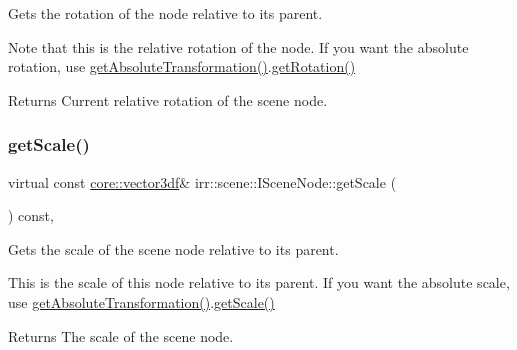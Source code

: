 Gets the rotation of the node relative to its parent. 

Note that this is the relative rotation of the node. If you want the absolute rotation, use \hyperlink{classirr_1_1scene_1_1ISceneNode_af13dc546a7be796cc0868a2eec51e508}{get\+Absolute\+Transformation()}.\hyperlink{classirr_1_1scene_1_1ISceneNode_acfef9f174e2398b479915791e4084061}{get\+Rotation()} \begin{DoxyReturn}{Returns}
Current relative rotation of the scene node. 
\end{DoxyReturn}
\mbox{\label{classirr_1_1scene_1_1ISceneNode_a97a5963f8b7b3cdf6fa196863c641c1d}} 
\subsubsection{\texorpdfstring{get\+Scale()}{getScale()}\hspace{0.1cm}{\footnotesize\ttfamily [1/2]}}
{\footnotesize\ttfamily virtual const \hyperlink{namespaceirr_1_1core_ae6e2b2a6c552833ebbd5b7463d03586b}{core\+::vector3df}\& irr\+::scene\+::\+I\+Scene\+Node\+::get\+Scale (\begin{DoxyParamCaption}{ }\end{DoxyParamCaption}) const\hspace{0.3cm}{\ttfamily [inline]}, {\ttfamily [virtual]}}



Gets the scale of the scene node relative to its parent. 

This is the scale of this node relative to its parent. If you want the absolute scale, use \hyperlink{classirr_1_1scene_1_1ISceneNode_af13dc546a7be796cc0868a2eec51e508}{get\+Absolute\+Transformation()}.\hyperlink{classirr_1_1scene_1_1ISceneNode_a97a5963f8b7b3cdf6fa196863c641c1d}{get\+Scale()} \begin{DoxyReturn}{Returns}
The scale of the scene node. 
\end{DoxyReturn}
\mbox{\label{classirr_1_1scene_1_1ISceneNode_a97a5963f8b7b3cdf6fa196863c641c1d}} 
